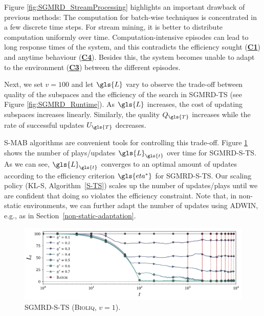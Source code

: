 Figure \ref{fig:SGMRD_StreamProcessing} highlights an important drawback of previous methods: The computation for batch-wise techniques is concentrated in a few discrete time steps. For stream mining, it is better to distribute computation uniformly over time. Computation-intensive episodes can lead to long response times of the system, and this contradicts the efficiency sought (\hyperlink{C1}{\textbf{C1}}) and anytime behaviour (\hyperlink{C4}{\textbf{C4}}). 
Besides this, the system becomes unable to adapt to the environment (\hyperlink{C3}{\textbf{C3}}) between the different episodes. 

Next, we set $v=100$ and let $\gls{L}$ vary to observe the trade-off between quality of the subspaces and the efficiency of the search in \textsc{\gls{SGMRD}-\gls{TS}} (see Figure \ref{fig:SGMRD_Runtime}). 
As $\gls{L}$ increases, %
the cost of updating subspaces increases linearly. 
Similarly, the quality $Q_{\gls{T}}$ increases while the rate of successful updates $U_{\gls{T}}$ decreases.

\gls{S-MAB} algorithms are convenient tools for controlling this trade-off. Figure \ref{fig:SGMRD_Scaling} shows the number of plays/updates $\gls{L}_{\gls{t}}$ over time for \textsc{\gls{SGMRD}-S-TS}.  
As we can see, $\gls{L}_{\gls{t}}$ converges to an optimal amount of updates according to the efficiency criterion $\gls{eta^*}$ for \textsc{\gls{SGMRD}-S-TS}. 
Our scaling policy (\textsc{\gls{KL-S}}, Algorithm~\ref{S-TS}) scales up the number of updates/plays until we are confident that doing so violates the efficiency constraint. 
Note that, in non-static environments, we can further adapt the number of updates using \gls{ADWIN}, e.g., as in Section~\ref{non-static-adaptation}. 

\begin{figure}
	\includegraphics[width=\linewidth]{part4-figures/pyro_Lt_3_2-compressed.pdf}
	\caption{\gls{SGMRD}-\gls{S-TS}  (\textsc{Bioliq}, $v = 1$).} 
	\label{fig:SGMRD_Scaling}
\end{figure} 

